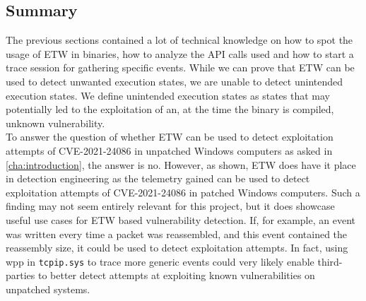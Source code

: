 \documentclass{report}
\begin{document}
\subsection{Summary}
The previous sections contained a lot of technical knowledge on how to spot the usage of \gls{ETW} in binaries, how to analyze the API calls used and how to start a trace session for gathering specific events. While we can prove that \gls{ETW} can be used to detect unwanted execution states, we are unable to detect unintended execution states. We define unintended execution states as states that may potentially led to the exploitation of an, at the time the binary is compiled, unknown vulnerability.
\\
To answer the question of whether \gls{ETW} can be used to detect exploitation attempts of CVE-2021-24086 in unpatched Windows computers as asked in \ref{cha:introduction}, the answer is no. However, as shown, \gls{ETW} does have it place in detection engineering as the telemetry gained can be used to detect exploitation attempts of CVE-2021-24086 in patched Windows computers. Such a finding may not seem entirely relevant for this project, but it does showcase useful use cases for \gls{ETW} based vulnerability detection. If, for example, an event was written every time a packet was reassembled, and this event contained the reassembly size, it could be used to detect exploitation attempts. In fact, using \gls{wpp} in \texttt{tcpip.sys} to trace more generic events could very likely enable third-parties to better detect attempts at exploiting known vulnerabilities on unpatched systems.
\end{document}
